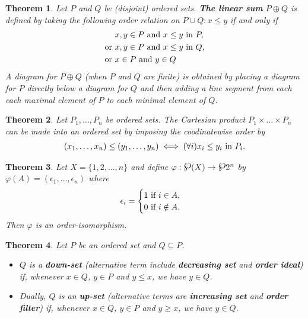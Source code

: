 \documentclass[a4paper,12pt,oneside]{report}%
\newcommand{\powerset}{\raisebox{.15\baselineskip}{\Large\ensuremath{\wp}}}
\newtheorem{theorem}{Theorem}
\begin{document}
\begin{theorem}
Let $P$ and $Q$ be (disjoint) ordered sets. \textbf{The linear sum}
    $P \oplus Q$ is defined by taking the following order relation on
    $P \cup Q: x \leq y$ if and only if
    \begin{align*}
                         &x,y \in P \textnormal{ and } x \leq y \textnormal{ in } P, \\
        \textnormal{or } &x,y \in P \textnormal{ and } x \leq y \textnormal{ in } Q, \\
        \textnormal{or } &x   \in P \textnormal{ and } y \in Q
    \end{align*}
A diagram for $P \oplus Q$ (when $P$ and $Q$ are finite) is obtained by placing
    a diagram for $P$ directly below a diagram for $Q$ and then adding a line
    segment from each \emph{each} maximal element of $P$ to \emph{each} minimal
    element of $Q$.
\end{theorem}

\begin{theorem}
    Let $P_{1}, \ldots, P_{n}$ be ordered sets. The Cartesian product
    $P_{1} \times \ldots \times P_{n}$ can be made into an ordered set by imposing
    the coodinatewise order by
    \begin{align*}
        (x_{1}, \ldots, x_{n}) \leq (y_{1}, \ldots, y_{n})
            \iff (\forall i) x_{i} \leq y_{i} \textnormal{ in } P_{i}.
    \end{align*}
\end{theorem}

\begin{theorem}
Let $X = \lbrace 1,2, \ldots ,n \rbrace$ and define
    $\varphi: \powerset(X) \rightarrow \powerset{2}^{n}$ by
    $\varphi(A) = ( \epsilon_{1}, \ldots, \epsilon_{n} )$ where
    \[
        \epsilon_{i} =
        \begin{cases}
            1 \textnormal{ if } i \in A, \\
            0 \textnormal{ if } i \notin A. \\
        \end{cases}
    \]
Then $\varphi$ is an order-isomorphism.
\end{theorem}

\begin{theorem}
Let $P$ be an ordered set and $Q \subseteq P$.
    \begin{itemize}
        \item $Q$ is a \textbf{down-set} (alternative term include
            \textbf{decreasing set} and \textbf{order ideal}) if, whenever
            $x \in Q$, $y \in P$ and $y \leq x$, we have $y \in Q$.
        \item Dually, $Q$ is an \textbf{up-set} (alternative terms are
            \textbf{increasing set} and \textbf{order filter}) if, whenever
            $x \in Q$, $y \in P$ and $y \geq x$, we have $y \in Q$.
    \end{itemize}
\end{theorem}
\end{document}
